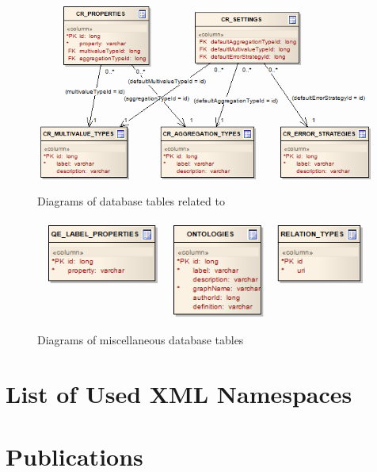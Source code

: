 \begin{figure}[htbp]
    \centering
    \includegraphics[scale=0.6]{images/db-cr.png}
    \caption{Diagrams of database tables related to \CR}
	\label{fig:dbCR}
\end{figure}

\begin{figure}[htbp]
    \centering
    \includegraphics[scale=0.6]{images/db-misc.png}
    \caption{Diagrams of miscellaneous database tables}
	\label{fig:dbMisc}
\end{figure}

\chapter{List of Used XML Namespaces}


\chapter{Publications}
\label{chap:publications}
\begingroup
\renewcommand{\chapter}[2]{}
\nocite{*}


\endgroup




